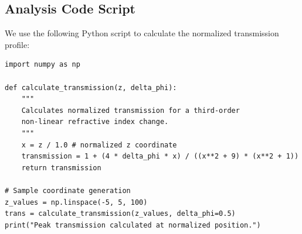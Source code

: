 \subsection{Analysis Code Script}
We use the following Python script to calculate the normalized transmission profile:
\begin{lstlisting}[style=pythonstyle, caption={Python routine for processing closed-aperture Z-scan values.}, label={lst:zscan_python}]
import numpy as np

def calculate_transmission(z, delta_phi):
    """
    Calculates normalized transmission for a third-order
    non-linear refractive index change.
    """
    x = z / 1.0 # normalized z coordinate
    transmission = 1 + (4 * delta_phi * x) / ((x**2 + 9) * (x**2 + 1))
    return transmission

# Sample coordinate generation
z_values = np.linspace(-5, 5, 100)
trans = calculate_transmission(z_values, delta_phi=0.5)
print("Peak transmission calculated at normalized position.")
\end{lstlisting}
